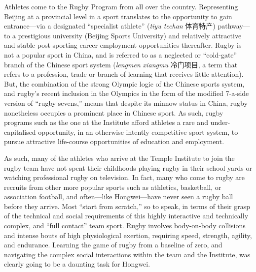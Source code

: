 Athletes come to the Rugby Program from all over the country.  Representing Beijing at a provincial level in a sport translates to the opportunity to gain entrance---via a designated ``specialist athlete'' (\textit{tiyu techan} 体育特产) pathway---to a prestigious university (Beijing Sports University) and relatively attractive and stable post-sporting career employment opportunities thereafter.  Rugby is not a popular sport in China, and is referred to as a neglected or ``cold-gate'' branch of the Chinese sport system (\textit{lengmen xiangmu} 冷门项目, a term that refers to a profession, trade or branch of learning that receives little attention). But, the combination of the strong Olympic logic of the Chinese sports system, and rugby's recent inclusion in the Olympics in the form of the modified 7-a-side version of ``rugby sevens,'' means that despite its minnow status in China, rugby nonetheless occupies a prominent place in Chinese sport.  As such, rugby programs such as the one at the Institute afford athletes a rare and under-capitalised opportunity, in an otherwise intently competitive sport system, to pursue attractive life-course opportunities of education and employment.

As such, many of the athletes who arrive at the Temple Institute to join the rugby team have not spent their childhoods playing rugby in their school yards or watching professional rugby on television.  In fact, many who come to rugby are recruits from other more popular sports such as athletics, basketball, or association football, and often---like Hongwei---have never seen a rugby ball before they arrive.  Most ``start from scratch,'' so to speak, in terms of their grasp of the technical and social requirements of this highly interactive and technically complex, and ``full contact'' team sport.  Rugby involves body-on-body collisions and intense bouts of high physiological exertion, requiring speed, strength, agility, and endurance.  Learning the game of rugby from a baseline of zero, and navigating the complex social interactions within the team and the Institute, was clearly going to be a daunting task for Hongwei.


